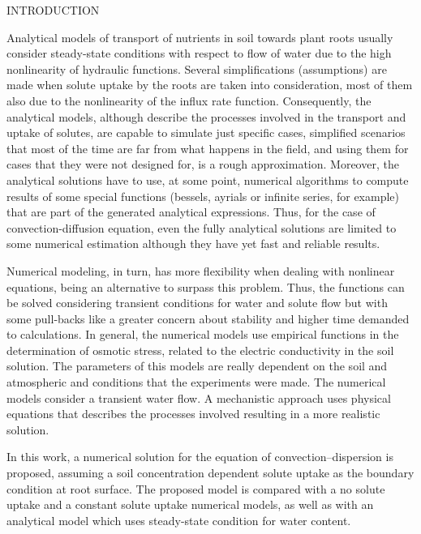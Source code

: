 \cleardoublepage
\chap INTRODUCTION

Analytical models of transport of nutrients in soil towards plant roots usually consider steady-state conditions with respect to flow of water due to the high nonlinearity of hydraulic functions. 
Several simplifications (assumptions) are made when solute uptake by the roots are taken into consideration, most of them also due to the nonlinearity of the influx rate function. 
Consequently, the analytical models, although describe the processes involved in the transport and uptake of solutes, are capable to simulate just specific cases, simplified scenarios that most of the time are far from what happens in the field, and using them for cases that they were not designed for, is a rough approximation.
Moreover, the analytical solutions have to use, at some point, numerical algorithms to compute results of some special functions (bessels, ayrials or infinite series, for example) that are part of the generated analytical expressions. Thus, for the case of convection-diffusion equation, even the fully analytical solutions are limited to some numerical estimation although they have yet fast and reliable results.

Numerical modeling, in turn, has more flexibility when dealing with nonlinear equations, being an alternative to surpass this problem. Thus, the functions can be solved considering transient conditions for water and solute flow but with some pull-backs like a greater concern about stability and higher time demanded to calculations.
In general, the numerical models use empirical functions in the determination of osmotic stress, related to the electric conductivity in the soil solution. The parameters of this models are really dependent on the soil and atmospheric  and conditions that the experiments were made.
The numerical models consider a transient water flow. A mechanistic approach uses physical equations that describes the processes involved resulting in a more realistic solution.

In this work, a numerical solution for the equation of convection--dispersion is proposed, assuming a soil concentration dependent solute uptake as the boundary condition at root surface. The proposed model is compared with a no solute uptake and a constant solute uptake numerical models, as well as with an analytical model which uses steady-state condition for water content. 


